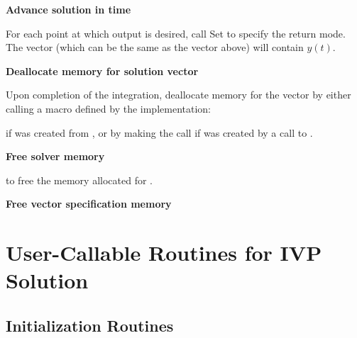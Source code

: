 \begin{Steps}
\item
  {\bf Advance solution in time}

  For each point at which output is desired, call
  Set  to specify the return mode.
  The vector  (which can be the same as
  the vector  above) will contain $y(t)$.
  
\item
  {\bf Deallocate memory for solution vector}

  Upon completion of the integration, deallocate memory for the vector 
  by either calling a macro defined by the {\nvector} implementation:

  {\s} 

  {\p} 

  if  was created from , or by making the call 
   if  was created by a call to .
  
\item
  {\bf Free solver memory}

   to free the memory allocated for {\cvodes}.
  
\item
  {\bf Free vector specification memory}

  {\s} 

  {\p} 
  
\end{Steps}

\section{User-Callable Routines for IVP Solution}
\label{s:cvodes_fct_sim}

\subsection{{\cvodes} Initialization Routines}\label{sss:cvodemalloc}


